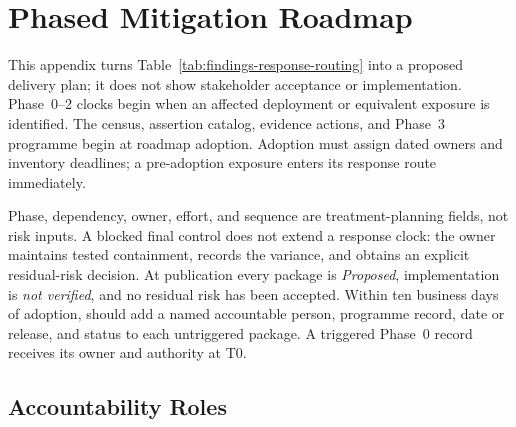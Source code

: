\documentclass[../main.tex]{subfiles}
\begin{document}
\section{Phased Mitigation Roadmap}
\label{app:phased-roadmap}

This appendix turns Table~\ref{tab:findings-response-routing} into a proposed
delivery plan; it does not show stakeholder acceptance or implementation.
Phase~0--2 clocks begin when an affected deployment or equivalent exposure is
identified. The  census,  assertion catalog, evidence
actions, and Phase~3 programme begin at roadmap adoption. Adoption must assign
dated owners and inventory deadlines; a pre-adoption exposure enters its
response route immediately.

Phase, dependency, owner, effort, and sequence are treatment-planning fields,
not risk inputs. A blocked final control does not extend a response clock: the
owner maintains tested containment, records the variance, and obtains an
explicit residual-risk decision. At publication every package is
\emph{Proposed}, implementation is \emph{not verified}, and no residual risk
has been accepted. Within ten business days of adoption,  should add
a named accountable person, programme record, date or release, and status to
each untriggered package. A triggered Phase~0 record receives its 
owner and  authority at T0.

\subsection{Accountability Roles}
\end{document}
